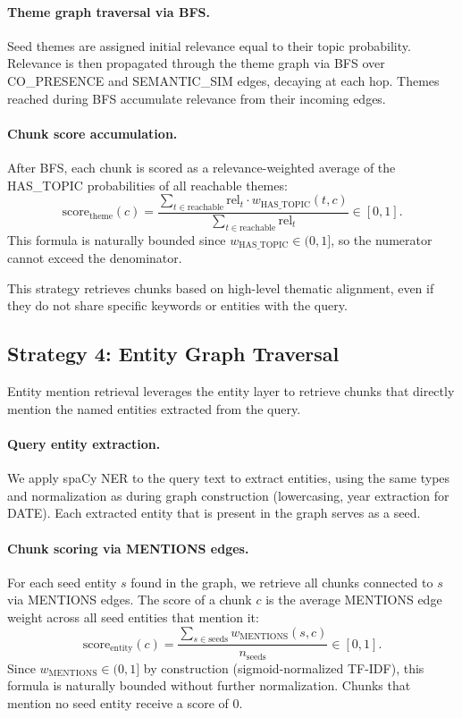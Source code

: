 \documentclass[10pt]{article}
\begin{document}
\paragraph{Theme graph traversal via BFS.} Seed themes are assigned initial
relevance equal to their topic probability. Relevance is then propagated through
the theme graph via BFS over CO\_PRESENCE and SEMANTIC\_SIM edges, decaying at
each hop. Themes reached during BFS accumulate relevance from their incoming edges.

\paragraph{Chunk score accumulation.} After BFS, each chunk is scored as a
relevance-weighted average of the HAS\_TOPIC probabilities of all reachable themes:
\[
\text{score}_{\text{theme}}(c) = \frac{\displaystyle\sum_{t \in \text{reachable}}
\text{rel}_t \cdot w_{\text{HAS\_TOPIC}}(t, c)}{\displaystyle\sum_{t \in
\text{reachable}} \text{rel}_t} \in [0, 1].
\]
This formula is naturally bounded since $w_{\text{HAS\_TOPIC}} \in (0,1]$,
so the numerator cannot exceed the denominator.

This strategy retrieves chunks based on high-level thematic alignment, even if
they do not share specific keywords or entities with the query.


\subsection{Strategy 4: Entity Graph Traversal}

Entity mention retrieval leverages the entity layer to retrieve chunks that
directly mention the named entities extracted from the query.

\paragraph{Query entity extraction.} We apply spaCy NER to the query text to
extract entities, using the same types and normalization as during graph
construction (lowercasing, year extraction for DATE). Each extracted entity that
is present in the graph serves as a seed.

\paragraph{Chunk scoring via MENTIONS edges.} For each seed entity $s$ found in
the graph, we retrieve all chunks connected to $s$ via MENTIONS edges. The score
of a chunk $c$ is the average MENTIONS edge weight across all seed entities that
mention it:
\[
\text{score}_{\text{entity}}(c) = \frac{\displaystyle\sum_{s \in \text{seeds}}
w_{\text{MENTIONS}}(s, c)}{n_{\text{seeds}}} \in [0, 1].
\]
Since $w_{\text{MENTIONS}} \in (0,1]$ by construction (sigmoid-normalized TF-IDF),
this formula is naturally bounded without further normalization. Chunks that
mention no seed entity receive a score of $0$.
\end{document}
